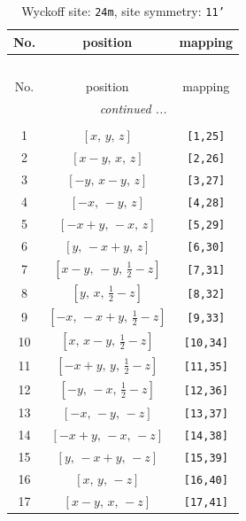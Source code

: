 \documentclass[fleqn,8pt]{jsarticle}
\begin{document}
\begin{longtable}{ccc}
\caption{Wyckoff site: {\tt 24m}, site symmetry: {\tt 11'}}
 \\
 \hline \hline
No. & position & mapping \\ \hline \endfirsthead

\multicolumn{2}{l}{\tablename\ \thetable{}} \\
 \hline \hline
No. & position & mapping \\ \hline \endhead

 \hline \hline
\multicolumn{2}{r}{\footnotesize\it continued ...} \\ \endfoot

 \hline \hline
\multicolumn{2}{r}{} \\ \endlastfoot

1 & $\left[ x,\, y,\, z \right]$ & {\tt [1,25]} \\ \hline
2 & $\left[ x - y,\, x,\, z \right]$ & {\tt [2,26]} \\ \hline
3 & $\left[ - y,\, x - y,\, z \right]$ & {\tt [3,27]} \\ \hline
4 & $\left[ - x,\, - y,\, z \right]$ & {\tt [4,28]} \\ \hline
5 & $\left[ - x + y,\, - x,\, z \right]$ & {\tt [5,29]} \\ \hline
6 & $\left[ y,\, - x + y,\, z \right]$ & {\tt [6,30]} \\ \hline
7 & $\left[ x - y,\, - y,\, \frac{1}{2} - z \right]$ & {\tt [7,31]} \\ \hline
8 & $\left[ y,\, x,\, \frac{1}{2} - z \right]$ & {\tt [8,32]} \\ \hline
9 & $\left[ - x,\, - x + y,\, \frac{1}{2} - z \right]$ & {\tt [9,33]} \\ \hline
10 & $\left[ x,\, x - y,\, \frac{1}{2} - z \right]$ & {\tt [10,34]} \\ \hline
11 & $\left[ - x + y,\, y,\, \frac{1}{2} - z \right]$ & {\tt [11,35]} \\ \hline
12 & $\left[ - y,\, - x,\, \frac{1}{2} - z \right]$ & {\tt [12,36]} \\ \hline
13 & $\left[ - x,\, - y,\, - z \right]$ & {\tt [13,37]} \\ \hline
14 & $\left[ - x + y,\, - x,\, - z \right]$ & {\tt [14,38]} \\ \hline
15 & $\left[ y,\, - x + y,\, - z \right]$ & {\tt [15,39]} \\ \hline
16 & $\left[ x,\, y,\, - z \right]$ & {\tt [16,40]} \\ \hline
17 & $\left[ x - y,\, x,\, - z \right]$ & {\tt [17,41]} \\ \hline

\end{longtable}
\end{document}
